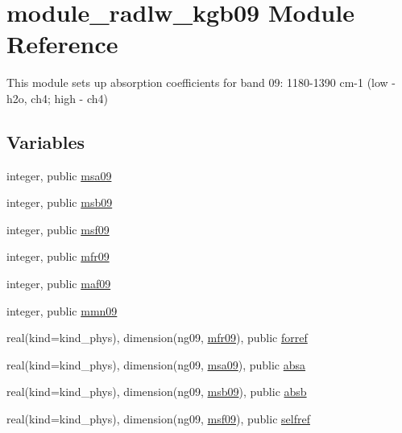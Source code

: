 \hypertarget{namespacemodule__radlw__kgb09}{}\section{module\+\_\+radlw\+\_\+kgb09 Module Reference}
\label{namespacemodule__radlw__kgb09}


This module sets up absorption coefficients for band 09\+: 1180-\/1390 cm-\/1 (low -\/ h2o, ch4; high -\/ ch4)  


\subsection*{Variables}
\begin{DoxyCompactItemize}
\item 
integer, public \hyperlink{namespacemodule__radlw__kgb09_ab739f0acab23f3140067506b396b3717}{msa09}
\item 
integer, public \hyperlink{namespacemodule__radlw__kgb09_a7e6bb7acb0df29586d0bd52f3fc41d90}{msb09}
\item 
integer, public \hyperlink{namespacemodule__radlw__kgb09_a7d728ef04b3f26c6b20149084334be5a}{msf09}
\item 
integer, public \hyperlink{namespacemodule__radlw__kgb09_a777f63022c4f7187446945c6e6ba77e7}{mfr09}
\item 
integer, public \hyperlink{namespacemodule__radlw__kgb09_a7d5d565c87af7ef07dc17930f9cb9e57}{maf09}
\item 
integer, public \hyperlink{namespacemodule__radlw__kgb09_aa9c8294b56ac3ce90b07114e986777a9}{mmn09}
\item 
real(kind=kind\+\_\+phys), dimension(ng09, \hyperlink{namespacemodule__radlw__kgb09_a777f63022c4f7187446945c6e6ba77e7}{mfr09}), public \hyperlink{namespacemodule__radlw__kgb09_a72a8c0879636dba20e2a8a35ba79f681}{forref}
\item 
real(kind=kind\+\_\+phys), dimension(ng09, \hyperlink{namespacemodule__radlw__kgb09_ab739f0acab23f3140067506b396b3717}{msa09}), public \hyperlink{namespacemodule__radlw__kgb09_a7a8726efe46fac4d6cce55ca357199ab}{absa}
\item 
real(kind=kind\+\_\+phys), dimension(ng09, \hyperlink{namespacemodule__radlw__kgb09_a7e6bb7acb0df29586d0bd52f3fc41d90}{msb09}), public \hyperlink{namespacemodule__radlw__kgb09_adb2110a245d9f01b3fd1ab058c883003}{absb}
\item 
real(kind=kind\+\_\+phys), dimension(ng09, \hyperlink{namespacemodule__radlw__kgb09_a7d728ef04b3f26c6b20149084334be5a}{msf09}), public \hyperlink{namespacemodule__radlw__kgb09_a1c65e91a215060738292d0ca5a8f38a2}{selfref}

\end{DoxyCompactItemize}
